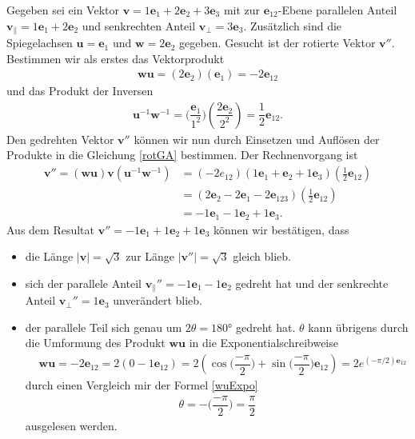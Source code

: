 \begin{beispiel} 
	Gegeben sei ein Vektor $\mathbf{v} = 1\mathbf{e}_1 + 2\mathbf{e}_2 + 3\mathbf{e}_3$ mit zur $\mathbf{e}_{12}$-Ebene parallelen Anteil $\mathbf{v_\parallel} = 1\mathbf{e}_1 + 2\mathbf{e}_2$ und senkrechten Anteil $\mathbf{v_\perp} = 3\mathbf{e}_3$. Zusätzlich sind die Spiegelachsen $\mathbf{u} = \mathbf{e}_1$ und $\mathbf{w} = 2\mathbf{e}_2$ gegeben. Gesucht ist der rotierte Vektor $\mathbf{v}''$. Bestimmen wir als erstes das Vektorprodukt
	\begin{align}
	\mathbf{wu} = (2\mathbf{e}_2)(\mathbf{e}_1) = -2\mathbf{e}_{12}
	\end{align}
	und das Produkt der Inversen
	\begin{align}
	\mathbf{u}^{-1}\mathbf{w}^{-1} = \biggl(\dfrac{\mathbf{e}_1}{1^2}\biggr) \left(\dfrac{2\mathbf{e}_2}{2^2}\right) = \dfrac{1}{2}\mathbf{e}_{12}.
	\end{align}
	Den gedrehten Vektor $\mathbf{v}''$ können wir nun durch Einsetzen und Auflösen der Produkte in die Gleichung \eqref{rotGA} bestimmen. Der Rechnenvorgang ist
	\begin{align}
	\mathbf{v}'' = (\mathbf{wu})\mathbf{v}(\mathbf{u}^{-1}\mathbf{w}^{-1}) &= (-2e_{12})(1\mathbf{e}_1 + \mathbf{e}_2 + 1\mathbf{e}_3)(\textstyle{\frac{1}{2}}\mathbf{e}_{12})\\
	&= (2\mathbf{e}_2-2\mathbf{e}_1-2\mathbf{e}_{123})(\textstyle{\frac{1}{2}}\mathbf{e}_{12})\\
	&= -1\mathbf{e}_1 - 1\mathbf{e}_2 + 1\mathbf{e}_3.
	\end{align}
	Aus dem Resultat $\mathbf{v}''= -1\mathbf{e}_1 + 1\mathbf{e}_2 + 1\mathbf{e}_3$ können wir bestätigen, dass
	\begin{itemize}
		\item die Länge $|\mathbf{v}| = \sqrt{3}$ zur Länge $|\mathbf{v}''|=\sqrt{3}$ gleich blieb.
		\item sich der parallele Anteil $\mathbf{v_\parallel}'' = -1\mathbf{e}_1 - 1\mathbf{e}_2$ gedreht hat und der senkrechte Anteil $\mathbf{v_\perp}'' = 1\mathbf{e}_3$ unverändert blieb.
		\item der parallele Teil sich genau um $2\theta=180$° gedreht hat. $\theta$ kann übrigens durch die Umformung des Produkt $\mathbf{wu}$ in die Exponentialschreibweise
		\begin{align}
		&\mathbf{wu} = -2\mathbf{e}_{12} = 2(0-1\mathbf{e}_{12})=2(\cos\biggl(\dfrac{-\pi}{2}\biggr) + \sin\biggl(\dfrac{-\pi}{2}\biggr)\mathbf{e}_{12}) = 2e^{(-\pi/2)\mathbf{e}_{12}}
		\end{align}
		durch einen Vergleich mir der Formel \eqref{wuExpo}
		\begin{align}
		\theta = -\biggl(\dfrac{-\pi}{2}\biggr) = \dfrac{\pi}{2}
		\end{align}
		ausgelesen werden.
	\end{itemize}
\end{beispiel} 